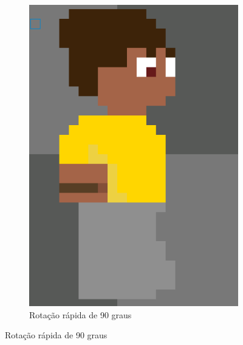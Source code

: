 \begin{figure}[htbp]
\begin{subfigure}{0.35\linewidth}
        \includegraphics[width=0.83\linewidth]{figs/pixelLab/dia2/rotacao 45 graus fix3 quick rotate.PNG}
        \caption{\small Rotação rápida de 90 graus}
        \label{fig:pixelLabRot9b}
    \end{subfigure}
\end{figure}


